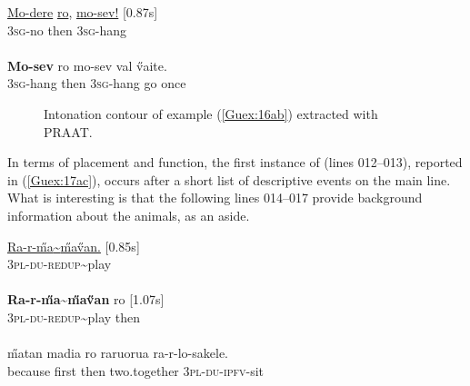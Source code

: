 \documentclass[output=paper]{LSP/langsci}
\begin{document}
\begin{exe}
\ex \label{Guex:16ab}
\begin{xlist}
\ex \label{Guex:16a}
\gll \underline{Mo-dere}          \underline{ro},                 \underline{mo-sev!}     [0.87s]\\
\textsc{3sg}-no     then  \textsc{3sg}-hang \\
\glt {}\\
\ex \label{Guex:16b}
\gll  \textbf{Mo-sev}       ro mo-sev         val   \H{v}aite.\\     	       
 \textsc{3sg}-hang   then   \textsc{3sg}-hang     go    once\\
\glt {} 
\end{xlist}
\end{exe}

\begin{figure}[ht]
\caption{Intonation contour of example (\ref{Guex:16ab}) extracted with PRAAT. \label{GuF6}}
\end{figure}


In terms of placement and function, the first instance of  (lines 012--013), reported in (\ref{Guex:17ac}), occurs after a short list of descriptive events on the main line. What is interesting is that the following lines 014--017 provide background information about the animals, as an aside. 

\begin{exe}
\ex \label{Guex:17ac}
\begin{xlist}
\ex \label{Guex:17a}
\gll \underline{Ra-r-\H{m}a{\textasciitilde}\H{m}a\H{v}an.}           [0.85s]\\
\textsc{3pl-du-redup}{\textasciitilde}play \\
\glt {}\\
\ex \label{Guex:17b}
\gll \textbf{Ra-r-\H{m}a{\textasciitilde}\H{m}a\H{v}an}              ro [1.07s]\\
\textsc{3pl-du-redup}{\textasciitilde}play   then\\
\glt {}\\
\ex \label{Guex:17c}
\gll   \H{m}atan     madia ro raruorua ra-r-lo-sakele.\\     	       
 because   first then two.together \textsc{3pl-du-ipfv}-sit\\
\glt {} 
\end{xlist}
\end{exe}
\end{document}
